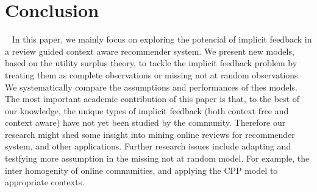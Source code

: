 \documentclass{llncs}
\begin{document}
\section{Conclusion}~\label{sec:con}
In this paper, we mainly focus on exploring the potencial of implicit feedback in a review guided context aware recommender system. We present new models, based on the utility surplus theory, to tackle the implicit feedback problem by treating them as complete observations or missing not at random observations. We systematically compare the assumptions and performances of thes models.
The most important academic contribution of this paper is that, to the best of our
knowledge, the unique types of implicit feedback (both context free and context aware) have not yet been studied by the community. Therefore our research might shed some insight into mining online reviews for recommender system, and other applications.
Further research issues include adapting and testfying more assumption in the missing not at random model.
For example, the inter homogenity of online communities, and applying the CPP model to appropriate contexts.
\end{document}

